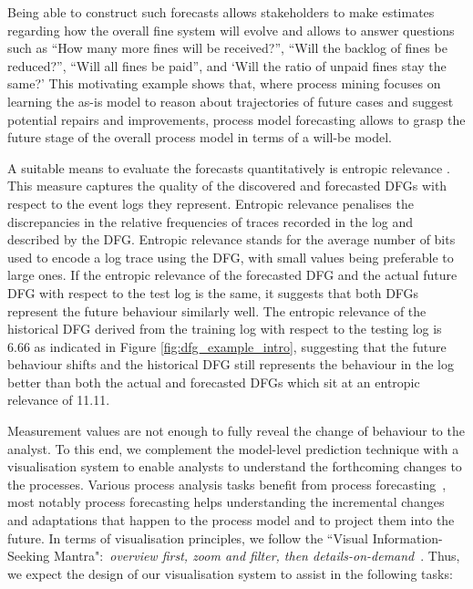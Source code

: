 Being able to construct such forecasts allows stakeholders to make estimates regarding how the overall fine system will evolve and allows to answer questions such as ``How many more fines will be received?'', ``Will the backlog of fines be reduced?'', ``Will all fines be paid'', and `Will the ratio of unpaid fines stay the same?'
This motivating example shows that, where process mining focuses on learning the as-is model to reason about trajectories of future cases and suggest potential repairs and improvements, process model forecasting allows to grasp the future stage of the overall process model in terms of a will-be model. %

A suitable means to evaluate the forecasts quantitatively is entropic relevance \cite{DBLP:conf/icpm/PolyvyanyyMG20}. This measure captures the quality of the discovered and forecasted DFGs with respect to the event logs they represent. 
Entropic relevance penalises the discrepancies in the relative frequencies of traces recorded in the log and described by the DFG. Entropic relevance stands for the average number of bits used to encode a log trace using the DFG, with small values being preferable to large ones.
If the entropic relevance of the forecasted DFG and the actual future DFG with respect to the test log is the same, it suggests that both DFGs represent the future behaviour similarly well. 
The entropic relevance of the historical DFG derived from the training log with respect to the testing log is 6.66 as indicated in Figure \ref{fig:dfg_example_intro}, 
suggesting that the future behaviour shifts and the historical DFG still represents the behaviour in the log better than both the actual and forecasted DFGs which sit at an entropic relevance of 11.11. 

Measurement values are not enough to fully reveal the change of behaviour to the analyst. To this end, we complement the model-level prediction technique with a visualisation system to enable analysts to understand the forthcoming changes to the processes. Various process analysis tasks benefit from process forecasting~\cite{DBLP:conf/bpm/PollPRRR18}, most notably process forecasting helps understanding the incremental changes and adaptations that happen to the process model and to project them into the future. In terms of visualisation principles, we follow the ``Visual Information-Seeking Mantra":~\emph{overview first, zoom and filter, then details-on-demand}~\cite{DBLP:conf/vl/Shneiderman96}. 
Thus, we expect the design of our visualisation system to assist in the following tasks:

